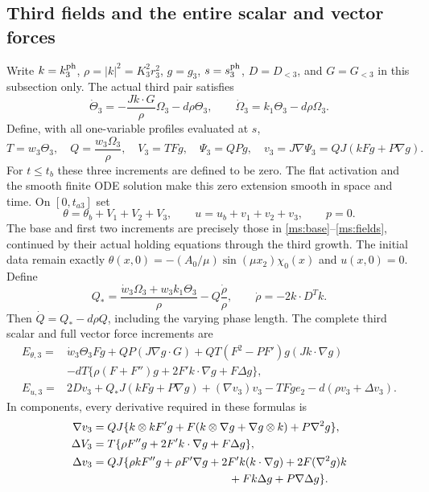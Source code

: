 \subsection{Third fields and the entire scalar and vector forces}

Write $k=k_3^{\rm ph}$, $\rho=|k|^2=K_3^2r_3^2$, $g=g_3$,
$s=s_3^{\rm ph}$, $D=D_{<3}$, and $G=G_{<3}$ in this
subsection only. The actual third pair satisfies
\begin{equation}\label{tgs:pair}
 \dot\Theta_3=-\frac{Jk\cdot G}{\rho}\Omega_3-d\rho\Theta_3,
 \qquad\dot\Omega_3=k_1\Theta_3-d\rho\Omega_3.
\end{equation}
Define, with all one-variable profiles evaluated at $s$,
\begin{equation}\label{tgs:fields}
 T=w_3\Theta_3,\quad Q=\frac{w_3\Omega_3}{\rho},\quad
 V_3=TFg,\quad\Psi_3=QPg,\quad
 v_3=J\nabla\Psi_3=QJ(kFg+P\nabla g).
\end{equation}
For $t\leq t_b$ these three increments are defined to be zero.
The flat activation and the smooth finite ODE solution make this
zero extension smooth in space and time. On $[0,t_{a3}]$ set
\[
 \theta=\theta_b+V_1+V_2+V_3,\qquad
 u=u_b+v_1+v_2+v_3,\qquad p=0.
\]
The base and first two increments are precisely those in
\eqref{ms:base}--\eqref{ms:fields}, continued by their actual
holding equations through the third growth. The initial data
remain exactly
$\theta(x,0)=-(A_0/\mu)\sin(\mu x_2)\chi_0(x)$ and $u(x,0)=0$.
Define
\begin{equation}\label{tgs:Qrest}
 Q_* =\frac{\dot w_3\Omega_3+w_3k_1\Theta_3}{\rho}
                         -Q\frac{\dot\rho}{\rho},\qquad
 \dot\rho=-2k\cdot D^Tk.
\end{equation}
Then $\dot Q=Q_*-d\rho Q$, including the varying phase length.
The complete third scalar and full vector force increments are
\begin{align}
 E_{\theta,3}={}&\dot w_3\Theta_3Fg+QP(J\nabla g\cdot G)
       +QT(F^2-PF')g(Jk\cdot\nabla g)\nonumber\\
 &-dT\{\rho(F+F'')g+2F'k\cdot\nabla g+F\Delta g\},
 \label{tgs:scalar}\\
 E_{u,3}={}&2Dv_3+Q_*J(kFg+P\nabla g)
        +(\nabla v_3)v_3-TFg e_2-d(\rho v_3+\Delta v_3).
 \label{tgs:vector}
\end{align}
In components, every derivative required in these formulas is
\begin{align}
 \nabla v_3={}&QJ\{k\otimes k F'g
       +F(k\otimes\nabla g+\nabla g\otimes k)+P\nabla^2g\},
 \label{tgs:velocityjet}\\
 \Delta V_3={}&T\{\rho F''g+2F'k\cdot\nabla g+F\Delta g\},
 \label{tgs:scalarLaplacian}\\
 \Delta v_3={}&QJ\{\rho kF''g+\rho F'\nabla g
       +2F'k(k\cdot\nabla g)+2F(\nabla^2g)k\nonumber\\
 &\hspace{38mm}+Fk\Delta g+P\nabla\Delta g\}.
 \label{tgs:vectorLaplacian}
\end{align}
